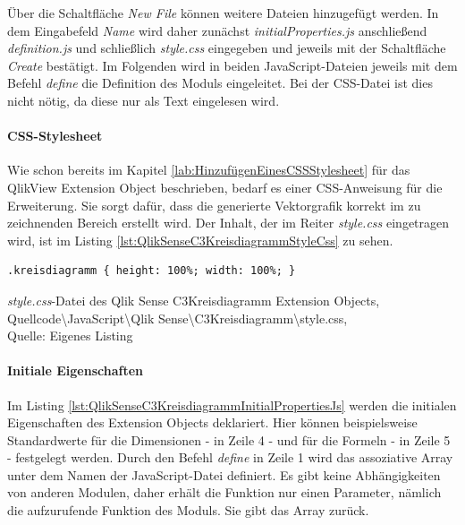 Über die Schaltfläche \textit{New File} können weitere Dateien hinzugefügt werden. In dem Eingabefeld \textit{Name} wird daher zunächst \textit{initialProperties.js} anschließend \textit{definition.js} und schließlich \textit{style.css} eingegeben und jeweils mit der Schaltfläche \textit{Create} bestätigt. Im Folgenden wird in beiden JavaScript-Dateien jeweils mit dem Befehl \textit{define} die Definition des Moduls eingeleitet. Bei der CSS-Datei ist dies nicht nötig, da diese nur als Text eingelesen wird.

\paragraph{CSS-Stylesheet}

Wie schon bereits im Kapitel \ref{lab:HinzufügenEinesCSSStylesheet} für das QlikView Extension Object beschrieben, bedarf es einer CSS-Anweisung für die Erweiterung. Sie sorgt dafür, dass die generierte Vektorgrafik korrekt im zu zeichnenden Bereich erstellt wird. Der Inhalt, der im Reiter \textit{style.css} eingetragen wird, ist im Listing \ref{lst:QlikSenseC3KreisdiagrammStyleCss} zu sehen.

\ifIncludeFigures\begin{listing}[htbp]
\begin{verbatim}
.kreisdiagramm { height: 100%; width: 100%; }
\end{verbatim}
\caption[\textit{style.css}-Datei des Qlik Sense C3Kreisdiagramm Extension Objects]{\textit{style.css}-Datei des Qlik Sense C3Kreisdiagramm Extension Objects, \\Quellcode\textbackslash{}JavaScript\textbackslash{}Qlik Sense\textbackslash{}C3Kreisdiagramm\textbackslash{}style.css, \\Quelle: Eigenes Listing}
\label{lst:QlikSenseC3KreisdiagrammStyleCss}
\end{listing}\fi

\paragraph{Initiale Eigenschaften}

Im Listing \ref{lst:QlikSenseC3KreisdiagrammInitialPropertiesJs} werden die initialen Eigenschaften des Extension Objects deklariert. Hier können beispielsweise Standardwerte für die Dimensionen - in Zeile 4 - und für die Formeln - in Zeile 5 - festgelegt werden. Durch den Befehl \textit{define} in Zeile 1 wird das assoziative Array unter dem Namen der JavaScript-Datei definiert. Es gibt keine Abhängig\-keiten von anderen Modulen, daher erhält die Funktion nur einen Parameter, nämlich die aufzurufende Funktion des Moduls. Sie gibt das Array zurück.

